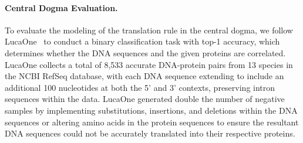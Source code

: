 \paragraph{Central Dogma Evaluation.}
To evaluate the modeling of the translation rule in the central dogma, we follow LucaOne~\citep{he2024lucaone} to conduct a binary classification task with top-1 accuracy, which determines whether the DNA sequences and the given proteins are correlated.
LucaOne collects a total of 8,533 accurate DNA-protein pairs from 13 species in the NCBI RefSeq database, with each DNA sequence extending to include an additional 100 nucleotides at both the 5' and 3' contexts, preserving intron sequences within the data. LucaOne generated
double the number of negative samples by implementing substitutions, insertions, and deletions within the DNA sequences or altering amino acids in the protein sequences to ensure the resultant DNA sequences could not be accurately translated into their respective proteins.

